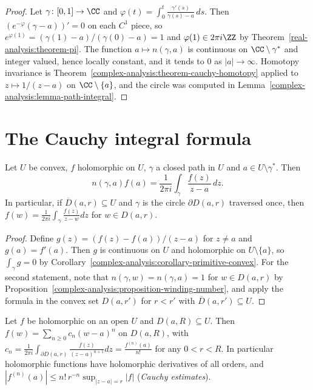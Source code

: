 \begin{proof}
Let $\gamma \colon [0, 1] \to \CC$ and $\varphi(t) = \int_0^t\frac{\gamma'(s)}{\gamma(s) - a}\,ds$. Then $(e^{-\varphi}(\gamma - a))' = 0$ on each $C^1$ piece, so $e^{\varphi(1)} = (\gamma(1) - a)/(\gamma(0) - a) = 1$ and
$\varphi(1) \in 2\pi i\ZZ$ by Theorem~\ref{real-analysis:theorem-pi}. The function $a \mapsto n(\gamma, a)$ is continuous on $\CC \setminus \gamma^*$ and integer valued, hence locally constant, and it tends
to $0$ as $|a| \to \infty$. Homotopy invariance is Theorem~\ref{complex-analysis:theorem-cauchy-homotopy} applied to $z \mapsto 1/(z - a)$ on $\CC \setminus \{a\}$, and the circle was computed in
Lemma~\ref{complex-analysis:lemma-path-integral}.
\end{proof}

\section{The Cauchy integral formula}\label{complex-analysis:section-cauchy-formula}

\begin{theorem}\label{complex-analysis:theorem-cauchy-formula}
Let $U$ be convex, $f$ holomorphic on $U$, $\gamma$ a closed path in $U$ and $a \in U \setminus \gamma^*$. Then
\[
n(\gamma, a)f(a) = \frac{1}{2\pi i}\int_\gamma\frac{f(z)}{z - a}\,dz.
\]
In particular, if $\overline{D}(a, r) \subseteq U$ and $\gamma$ is the circle $\partial D(a, r)$ traversed once, then $f(w) = \frac{1}{2\pi i}\int_\gamma\frac{f(z)}{z - w}dz$ for $w \in D(a, r)$.
\end{theorem}

\begin{proof}
Define $g(z) = (f(z) - f(a))/(z - a)$ for $z \neq a$ and $g(a) = f'(a)$. Then $g$ is continuous on $U$ and holomorphic on $U \setminus \{a\}$, so $\int_\gamma g = 0$ by
Corollary~\ref{complex-analysis:corollary-primitive-convex}. For the second statement, note that $n(\gamma, w) = n(\gamma, a) = 1$ for $w \in D(a, r)$ by
Proposition~\ref{complex-analysis:proposition-winding-number}, and apply the formula in the convex set $D(a, r')$ for $r < r' $ with $\overline{D}(a, r') \subseteq U$.
\end{proof}

\begin{theorem}\label{complex-analysis:theorem-analytic}
Let $f$ be holomorphic on an open $U$ and $D(a, R) \subseteq U$. Then $f(w) = \sum_{n \geq 0}c_n(w - a)^n$ on $D(a, R)$, with
$c_n = \frac{1}{2\pi i}\int_{\partial D(a, r)}\frac{f(z)}{(z - a)^{n+1}}dz = \frac{f^{(n)}(a)}{n!}$ for any $0 < r < R$. In particular holomorphic functions have holomorphic derivatives of all orders, and
$|f^{(n)}(a)| \leq n!\,r^{-n}\sup_{|z - a| = r}|f|$ (\emph{Cauchy estimates}).
\end{theorem}


